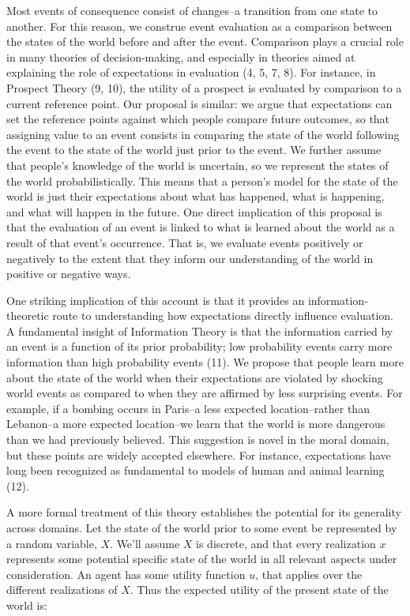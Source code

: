 \documentclass[9pt,twocolumn,twoside,]{pnas-new}
\begin{document}
Most events of consequence consist of changes--a transition from one
state to another. For this reason, we construe event evaluation as a
comparison between the states of the world before and after the event.
Comparison plays a crucial role in many theories of decision-making, and
especially in theories aimed at explaining the role of expectations in
evaluation (4, 5, 7, 8). For instance, in Prospect Theory (9, 10), the
utility of a prospect is evaluated by comparison to a current reference
point. Our proposal is similar: we argue that expectations can set the
reference points against which people compare future outcomes, so that
assigning value to an event consists in comparing the state of the world
following the event to the state of the world just prior to the event.
We further assume that people's knowledge of the world is uncertain, so
we represent the states of the world probabilistically. This means that
a person's model for the state of the world is just their expectations
about what has happened, what is happening, and what will happen in the
future. One direct implication of this proposal is that the evaluation
of an event is linked to what is learned about the world as a result of
that event's occurrence. That is, we evaluate events positively or
negatively to the extent that they inform our understanding of the world
in positive or negative ways.

One striking implication of this account is that it provides an
information-theoretic route to understanding how expectations directly
influence evaluation. A fundamental insight of Information Theory is
that the information carried by an event is a function of its prior
probability; low probability events carry more information than high
probability events (11). We propose that people learn more about the
state of the world when their expectations are violated by shocking
world events as compared to when they are affirmed by less surprising
events. For example, if a bombing occurs in Paris--a less expected
location--rather than Lebanon--a more expected location--we learn that
the world is more dangerous than we had previously believed. This
suggestion is novel in the moral domain, but these points are widely
accepted elsewhere. For instance, expectations have long been recognized
as fundamental to models of human and animal learning (12).

A more formal treatment of this theory establishes the potential for its
generality across domains. Let the state of the world prior to some
event be represented by a random variable, \(X\). We'll assume \(X\) is
discrete, and that every realization \(x\) represents some potential
specific state of the world in all relevant aspects under consideration.
An agent has some utility function \(u\), that applies over the
different realizations of \(X\). Thus the expected utility of the
present state of the world is:
\end{document}
